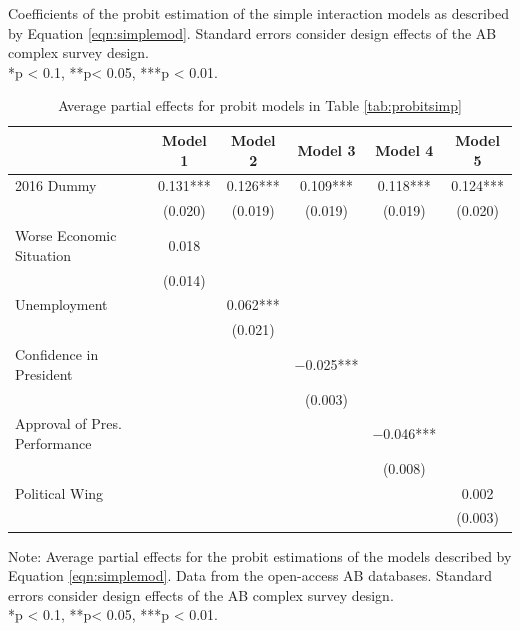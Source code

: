 \documentclass[floatsintext,man]{apa7}\usepackage[]{graphicx}\usepackage[]{color}
\begin{document}
\begin{table}[htbp]
\begin{center}
\end{center}
Coefficients of the probit estimation of the simple interaction models as described by Equation \ref{eqn:simplemod}. Standard errors consider design effects of the AB complex survey design. \\ 
*p < 0.1, **p< 0.05, ***p < 0.01.
\end{table}

\begin{table}[htbp]
\renewcommand{\arraystretch}{0.6}
\begin{center}
\caption{Average partial effects for probit models in Table \ref{tab:probitsimp}}
\label{tab:probitsimpape}

\begin{tabular}[t]{lccccc}
\toprule
  & Model 1 & Model 2 & Model 3 & Model 4 & Model 5\\
\midrule
2016 Dummy & \num{0.131}*** & \num{0.126}*** & \num{0.109}*** & \num{0.118}*** & \num{0.124}***\\
 & (\num{0.020}) & (\num{0.019}) & (\num{0.019}) & (\num{0.019}) & (\num{0.020})\\
Worse Economic Situation & \num{0.018} &  &  &  & \\
 & (\num{0.014}) &  &  &  & \\
Unemployment &  & \num{0.062}*** &  &  & \\
 &  & (\num{0.021}) &  &  & \\
Confidence in President &  &  & \num{-0.025}*** &  & \\
 &  &  & (\num{0.003}) &  & \\
Approval of Pres. Performance &  &  &  & \num{-0.046}*** & \\
 &  &  &  & (\num{0.008}) & \\
Political Wing &  &  &  &  & \num{0.002}\\
 &  &  &  &  & (\num{0.003})\\
\bottomrule
\end{tabular}


\end{center}
Note: Average partial effects for the probit estimations of the models described by Equation \ref{eqn:simplemod}. Data from the open-access AB databases. Standard errors consider design effects of the AB complex survey design.\\
*p < 0.1, **p< 0.05, ***p < 0.01.
\end{table}
\end{document}
